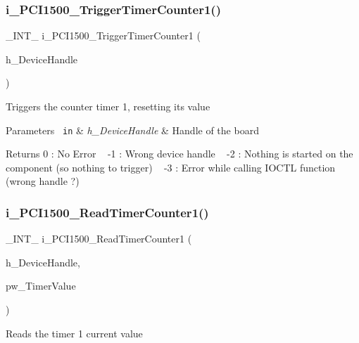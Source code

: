 \subsubsection{\texorpdfstring{i\_PCI1500\_TriggerTimerCounter1()}{i\_PCI1500\_TriggerTimerCounter1()}}
{\footnotesize\ttfamily \+\_\+\+I\+N\+T\+\_\+ i\+\_\+\+P\+C\+I1500\+\_\+\+Trigger\+Timer\+Counter1 (\begin{DoxyParamCaption}\item[{H\+A\+N\+D\+LE}]{h\+\_\+\+Device\+Handle }\end{DoxyParamCaption})}

Triggers the counter timer 1, resetting its value


\begin{DoxyParams}[1]{Parameters}
\mbox{\texttt{ in}}  & {\em h\+\_\+\+Device\+Handle} & Handle of the board\\
\hline
\end{DoxyParams}
\begin{DoxyReturn}{Returns}
0 \+: No Error ~\newline
 -\/1 \+: Wrong device handle ~\newline
 -\/2 \+: Nothing is started on the component (so nothing to trigger) ~\newline
 -\/3 \+: Error while calling I\+O\+C\+TL function (wrong handle ?) ~\newline

\end{DoxyReturn}
\mbox{\label{group___timer1_ga21c9300b0e81aaaf7b8674710735c114}} 
\subsubsection{\texorpdfstring{i\_PCI1500\_ReadTimerCounter1()}{i\_PCI1500\_ReadTimerCounter1()}}
{\footnotesize\ttfamily \+\_\+\+I\+N\+T\+\_\+ i\+\_\+\+P\+C\+I1500\+\_\+\+Read\+Timer\+Counter1 (\begin{DoxyParamCaption}\item[{H\+A\+N\+D\+LE}]{h\+\_\+\+Device\+Handle,  }\item[{P\+W\+O\+RD}]{pw\+\_\+\+Timer\+Value }\end{DoxyParamCaption})}

Reads the timer 1 current value


